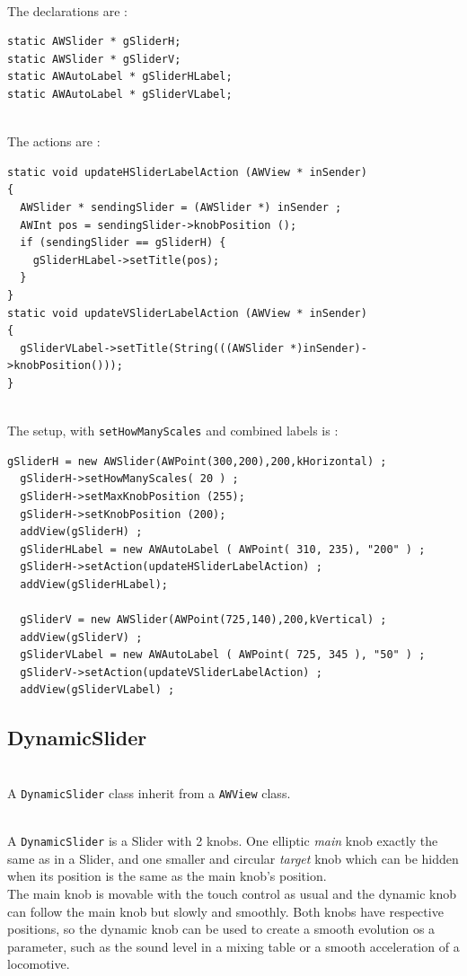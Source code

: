 \documentclass[a4paper,11pt]{extarticle}
\begin{document}
~\\ The declarations are :

\begin{lstlisting}[language=Arduinonl]
static AWSlider * gSliderH;
static AWSlider * gSliderV;
static AWAutoLabel * gSliderHLabel;
static AWAutoLabel * gSliderVLabel;
\end{lstlisting}

~\\ The actions are :

\begin{lstlisting}[language=Arduinonl]
static void updateHSliderLabelAction (AWView * inSender)
{
  AWSlider * sendingSlider = (AWSlider *) inSender ;
  AWInt pos = sendingSlider->knobPosition ();
  if (sendingSlider == gSliderH) {
    gSliderHLabel->setTitle(pos);
  }
}
static void updateVSliderLabelAction (AWView * inSender)
{
  gSliderVLabel->setTitle(String(((AWSlider *)inSender)->knobPosition()));
}
\end{lstlisting}

~\\ The setup, with \texttt{setHowManyScales} and combined labels is :

\begin{lstlisting}[language=Arduinonl]
  gSliderH = new AWSlider(AWPoint(300,200),200,kHorizontal) ;
  gSliderH->setHowManyScales( 20 ) ;
  gSliderH->setMaxKnobPosition (255);
  gSliderH->setKnobPosition (200);
  addView(gSliderH) ;
  gSliderHLabel = new AWAutoLabel ( AWPoint( 310, 235), "200" ) ;
  gSliderH->setAction(updateHSliderLabelAction) ;
  addView(gSliderHLabel);
  
  gSliderV = new AWSlider(AWPoint(725,140),200,kVertical) ;
  addView(gSliderV) ;
  gSliderVLabel = new AWAutoLabel ( AWPoint( 725, 345 ), "50" ) ;
  gSliderV->setAction(updateVSliderLabelAction) ;
  addView(gSliderVLabel) ;
\end{lstlisting}



\newpage
\subsection{DynamicSlider}

~\\ A \texttt{DynamicSlider} class inherit from a \texttt{AWView} class.

~\\ A \texttt{DynamicSlider} is a Slider with 2 knobs. One elliptic \emph{main} knob exactly the same as in a Slider, and one smaller and circular \emph{target} knob which can be hidden when its position is the same as the main knob's position.
~\\ The main knob is movable with the touch control as usual and the dynamic knob can follow the main knob but slowly and smoothly. Both knobs have respective positions, so the dynamic knob can be used to create a smooth evolution os a parameter, such as the sound level in a mixing table or a smooth acceleration of a locomotive.
~\\
\end{document}
